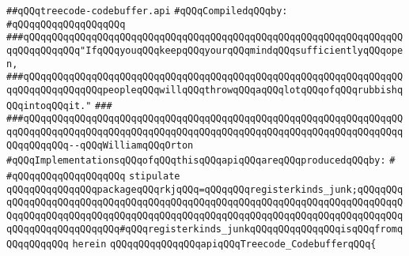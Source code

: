 \label{src/lib/compiler/back/low/treecode/treecode-codebuffer.api}
\verb|##qQQqtreecode-codebuffer.api|\newline
\newline
\verb|#qQQqCompiledqQQqby:|\newline
\verb|#qQQqqQQqqQQqqQQqqQQq|\newline
\newline
\newline
\newline
\verb|###qQQqqQQqqQQqqQQqqQQqqQQqqQQqqQQqqQQqqQQqqQQqqQQqqQQqqQQqqQQqqQQqqQQqqQQqqQQqqQQq"IfqQQqyouqQQqkeepqQQqyourqQQqmindqQQqsufficientlyqQQqopen,|\newline
\verb|###qQQqqQQqqQQqqQQqqQQqqQQqqQQqqQQqqQQqqQQqqQQqqQQqqQQqqQQqqQQqqQQqqQQqqQQqqQQqqQQqqQQqpeopleqQQqwillqQQqthrowqQQqaqQQqlotqQQqofqQQqrubbishqQQqintoqQQqit."|\newline
\verb|###|\newline
\verb|###qQQqqQQqqQQqqQQqqQQqqQQqqQQqqQQqqQQqqQQqqQQqqQQqqQQqqQQqqQQqqQQqqQQqqQQqqQQqqQQqqQQqqQQqqQQqqQQqqQQqqQQqqQQqqQQqqQQqqQQqqQQqqQQqqQQqqQQqqQQqqQQqqQQq--qQQqWilliamqQQqOrton|\newline
\newline
\newline
\newline
\verb|#qQQqImplementationsqQQqofqQQqthisqQQqapiqQQqareqQQqproducedqQQqby:|\newline
\verb|#|\newline
\verb|#qQQqqQQqqQQqqQQqqQQq|\newline
\newline
\verb|stipulate|\newline
\verb|qQQqqQQqqQQqqQQqpackageqQQqrkjqQQq=qQQqqQQqregisterkinds_junk;qQQqqQQqqQQqqQQqqQQqqQQqqQQqqQQqqQQqqQQqqQQqqQQqqQQqqQQqqQQqqQQqqQQqqQQqqQQqqQQqqQQqqQQqqQQqqQQqqQQqqQQqqQQqqQQqqQQqqQQqqQQqqQQqqQQqqQQqqQQqqQQqqQQqqQQqqQQqqQQqqQQqqQQq#qQQqregisterkinds_junkqQQqqQQqqQQqqQQqisqQQqfromqQQqqQQqqQQq|\newline
\verb|herein|\newline
\newline
\verb|qQQqqQQqqQQqqQQqapiqQQqTreecode_CodebufferqQQq{|\newline
